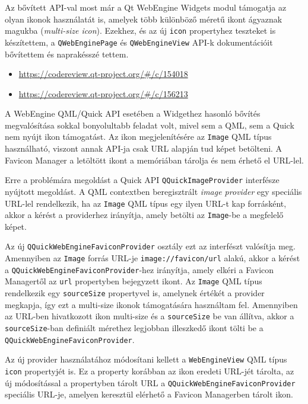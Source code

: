 \documentclass[12pt]{report}
\let\origurl\url
\renewcommand{\url}[1]{%
    \textcolor{blue}{\origurl{#1}}
}
\newcommand{\gerrit}[1]{%
    \textcolor{qtgreen}{\origurl{https://codereview.qt-project.org/\#/c/#1}}
}
\begin{document}
Az bővített API-val most már a Qt WebEngine Widgets modul támogatja az olyan ikonok
használatát is, amelyek több különböző méretű ikont ágyaznak magukba
(\textit{multi-size icon}). Ezekhez, és az új \texttt{icon} propertyhez teszteket is
készítettem, a \texttt{QWebEnginePage} és \texttt{QWebEngineView} API-k dokumentációit
bővítettem és naprakésszé tettem.

\begin{center}
    \begin{reviewbox}
        \begin{itemize}
            \renewcommand{\labelitemi}{\textcolor{qtgreen}{$\blacktriangleright$}}
            \item \gerrit{154018}
            \item \gerrit{156213}
        \end{itemize}
    \end{reviewbox}
\end{center}

A WebEngine QML/Quick API esetében a Widgethez hasonló bővítés megvalósítása sokkal
bonyolultabb feladat volt, mivel sem a QML, sem a Quick nem nyújt ikon támogatást. Az ikon
megjelenítésére az \texttt{Image} QML típus használható, viszont annak API-ja csak URL
alapján tud képet betölteni. A Favicon Manager a letöltött ikont a memóriában tárolja és nem
érhető el URL-lel.

Erre a problémára megoldást a Quick API \texttt{QQuickImageProvider} interfésze nyújtott
megoldást. A QML contextben beregisztrált \textit{image provider} egy speciális URL-lel
rendelkezik, ha az \texttt{Image} QML típus egy ilyen URL-t kap forrásként, akkor a kérést
a providerhez irányítja, amely betölti az \texttt{Image}-be a megfelelő képet.

Az új \texttt{QQuickWebEngineFaviconProvider} osztály ezt az interfészt valósítja meg.
Amennyiben az \texttt{Image} forrás URL-je \texttt{image://favicon/url} alakú, akkor a
kérést a \texttt{QQuickWebEngineFaviconProvider}-hez irányítja, amely elkéri a
Favicon Managertől az \texttt{url} propertyben bejegyzett ikont. Az \texttt{Image} QML típus
rendelkezik egy \texttt{sourceSize} propertyvel is, amelynek értékét a provider megkapja,
így ezt a multi-size ikonok támogatására használtam fel. Amennyiben az URL-ben hivatkozott
ikon multi-size és a \texttt{sourceSize} be van állítva, akkor a \texttt{sourceSize}-ban
definiált mérethez legjobban illeszkedő ikont tölti be a
\texttt{QQuickWebEngineFaviconProvider}.

Az új provider használatához módosítani kellett a \texttt{WebEngineView} QML típus
\texttt{icon} propertyjét is. Ez a property korábban az ikon eredeti URL-jét tárolta,
az új módosítással a propertyben tárolt URL a \texttt{QQuickWebEngineFaviconProvider}
speciális URL-je, amelyen keresztül elérhető a Favicon Managerben tárolt ikon.
\end{document}
